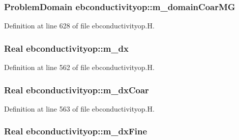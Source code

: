 \subsubsection[{\texorpdfstring{m\+\_\+domain\+Coar\+MG}{m_domainCoarMG}}]{\setlength{\rightskip}{0pt plus 5cm}Problem\+Domain ebconductivityop\+::m\+\_\+domain\+Coar\+MG\hspace{0.3cm}{\ttfamily [protected]}}\hypertarget{classebconductivityop_aa3b9d52aabbfb94983ebc6627afeeea6}{}\label{classebconductivityop_aa3b9d52aabbfb94983ebc6627afeeea6}


Definition at line 628 of file ebconductivityop.\+H.

\subsubsection[{\texorpdfstring{m\+\_\+dx}{m_dx}}]{\setlength{\rightskip}{0pt plus 5cm}Real ebconductivityop\+::m\+\_\+dx\hspace{0.3cm}{\ttfamily [protected]}}\hypertarget{classebconductivityop_a1a550b6a31545943978f6c98e2006bc2}{}\label{classebconductivityop_a1a550b6a31545943978f6c98e2006bc2}


Definition at line 562 of file ebconductivityop.\+H.

\subsubsection[{\texorpdfstring{m\+\_\+dx\+Coar}{m_dxCoar}}]{\setlength{\rightskip}{0pt plus 5cm}Real ebconductivityop\+::m\+\_\+dx\+Coar\hspace{0.3cm}{\ttfamily [protected]}}\hypertarget{classebconductivityop_a454a4fd4452e8b15921d6a498d52d427}{}\label{classebconductivityop_a454a4fd4452e8b15921d6a498d52d427}


Definition at line 563 of file ebconductivityop.\+H.

\subsubsection[{\texorpdfstring{m\+\_\+dx\+Fine}{m_dxFine}}]{\setlength{\rightskip}{0pt plus 5cm}Real ebconductivityop\+::m\+\_\+dx\+Fine\hspace{0.3cm}{\ttfamily [protected]}}\hypertarget{classebconductivityop_a127419d21e5b738457f9ea0cc847890e}{}\label{classebconductivityop_a127419d21e5b738457f9ea0cc847890e}


